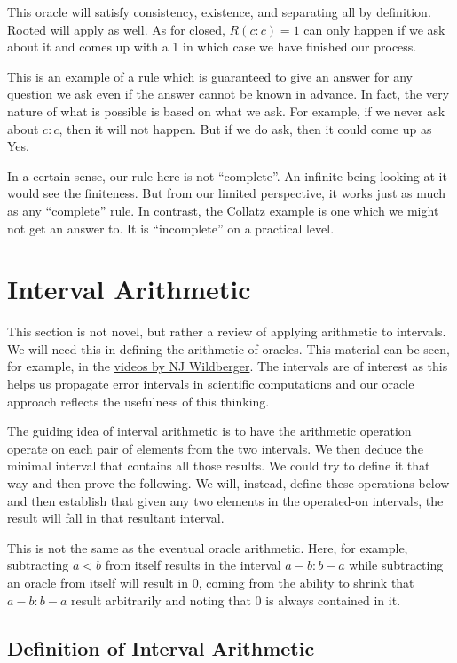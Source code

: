 \documentclass[12pt]{article}
\theoremstyle{remark}
\begin{document}
This oracle will satisfy consistency, existence, and separating all by definition. Rooted will apply as well. As for closed, $R(c:c)=1$ can only happen if we ask about it and comes up with a 1 in which case we have finished our process. 

This is an example of a rule which is guaranteed to give an answer for any question we ask even if the answer cannot be known in advance. In fact, the very nature of what is possible is based on what we ask. For example, if we never ask about  $c:c$, then it will not happen. But if we do ask, then it could come up as Yes. 

In a certain sense, our rule here is not ``complete''. An infinite being looking at it would see the finiteness. But from our limited perspective, it works just as much as any ``complete'' rule. In contrast, the Collatz example is one which we might not get an answer to. It is ``incomplete'' on a practical level. 

\section{Interval Arithmetic}

This section is not novel, but rather a review of applying arithmetic to intervals. We will need this in defining the arithmetic of oracles. This material can be seen, for example, in the \href{https://cosmolearning.org/video-lectures/measurement-approximation-interval-arithmetic-i/}{videos by NJ Wildberger}. The intervals are of interest as this helps us propagate error intervals in scientific computations and our oracle approach reflects the usefulness of this thinking. 

The guiding idea of interval arithmetic is to have the arithmetic operation operate on each pair of elements from the two intervals. We then deduce the minimal interval that contains all those results. We could try to define it that way and then prove the following. We will, instead, define these operations below and then establish that given any two elements in the operated-on intervals, the result will fall in that resultant interval. 

This is not the same as the eventual oracle arithmetic. Here, for example, subtracting $a<b$ from itself results in the interval $a-b:b-a$ while subtracting an oracle from itself will result in $0$, coming from the ability to shrink that $a-b:b-a$ result arbitrarily and noting that $0$ is always contained in it. 

\subsection{Definition of Interval Arithmetic}
\end{document}
